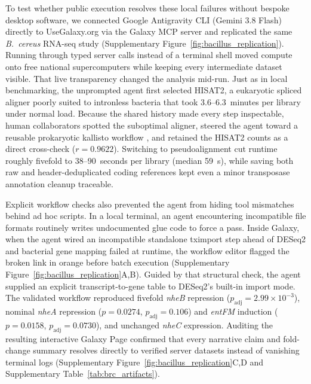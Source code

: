 \documentclass[11pt,letterpaper]{article}
\newcommand{\tool}[1]{\textsf{#1}}
\begin{document}
To test whether public execution resolves these local failures without bespoke desktop software, we connected Google Antigravity CLI (Gemini 3.8 Flash) directly to UseGalaxy.org via the Galaxy MCP server \cite{galaxymcp2026} and replicated the same \textit{B.\ cereus} RNA-seq study (Supplementary Figure~\ref{fig:bacillus_replication}). Running through typed server calls instead of a terminal shell moved compute onto free national supercomputers while keeping every intermediate dataset visible. That live transparency changed the analysis mid-run. Just as in local benchmarking, the unprompted agent first selected \tool{HISAT2}, a eukaryotic spliced aligner poorly suited to intronless bacteria that took 3.6--6.3~minutes per library under normal load. Because the shared history made every step inspectable, human collaborators spotted the suboptimal aligner, steered the agent toward a reusable prokaryotic \tool{kallisto} workflow \cite{bray2016near}, and retained the \tool{HISAT2} counts as a direct cross-check ($r = 0.9622$). Switching to pseudoalignment cut runtime roughly fivefold to 38--90~seconds per library (median 59~s), while saving both raw and header-deduplicated coding references kept even a minor transposase annotation cleanup traceable.

Explicit workflow checks also prevented the agent from hiding tool mismatches behind ad hoc scripts. In a local terminal, an agent encountering incompatible file formats routinely writes undocumented glue code to force a pass. Inside Galaxy, when the agent wired an incompatible standalone \tool{tximport} step ahead of \tool{DESeq2} and bacterial gene mapping failed at runtime, the workflow editor flagged the broken link in orange before batch execution (Supplementary Figure~\ref{fig:bacillus_replication}A,B). Guided by that structural check, the agent supplied an explicit transcript-to-gene table to \tool{DESeq2}'s built-in import mode. The validated workflow reproduced fivefold \textit{nheB} repression ($p_{\text{adj}} = 2.99 \times 10^{-3}$), nominal \textit{nheA} repression ($p = 0.0274$, $p_{\text{adj}} = 0.106$) and \textit{entFM} induction ($p = 0.0158$, $p_{\text{adj}} = 0.0730$), and unchanged \textit{nheC} expression. Auditing the resulting interactive Galaxy Page confirmed that every narrative claim and fold-change summary resolves directly to verified server datasets instead of vanishing terminal logs (Supplementary Figure~\ref{fig:bacillus_replication}C,D and Supplementary Table~\ref{tab:brc_artifacts}).
\end{document}
